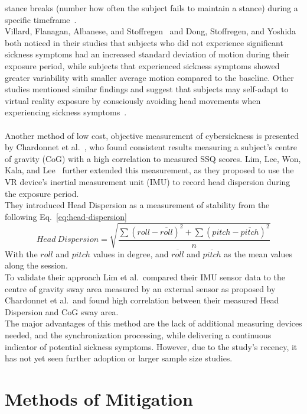 stance breaks (number how often the subject fails to maintain a stance) during a specific
timeframe~\cite{Rebenitsch2016}.
\\
Villard, Flanagan, Albanese, and Stoffregen~\cite{Villard2008} and Dong, Stoffregen, and
Yoshida~\cite{Dong2011, Dong2010} both noticed in their studies that subjects who did not experience significant
sickness symptoms had an increased standard deviation of motion during their exposure period, while subjects that
experienced sickness symptoms showed greater variability with smaller average motion compared to the baseline.
Other studies mentioned similar findings and suggest that subjects may self-adapt to virtual reality exposure by
consciously avoiding head movements when experiencing sickness symptoms~\cite{Rebenitsch2016}.
\\
\\
Another method of low cost, objective measurement of cybersickness is presented by Chardonnet et
al.~\cite{Chardonnet2015}, who found consistent results measuring a subject's centre of gravity (CoG) with a high
correlation to measured SSQ scores.
Lim, Lee, Won, Kala, and Lee~\cite{Lim2020} further extended this measurement, as they proposed to use the VR device's
inertial measurement unit (IMU) to record head dispersion during the exposure period.
\\
They introduced Head Dispersion as a measurement of stability from the following Eq.~\ref{eq:head-dispersion}
\begin{equation}
    \label{eq:head-dispersion}
    Head\ Dispersion = \sqrt{\frac{\sum(roll - \overline{roll})^2 + \sum{(pitch - \overline{pitch})^2}} {n}}
\end{equation}
With the $roll$ and $pitch$ values in degree, and $\overline{roll}$ and $\overline{pitch}$ as the mean values along
the session.
\\
To validate their approach Lim et al.\ compared their IMU sensor data to the centre of gravity sway area measured by an
external sensor as proposed by Chardonnet et al.\ and found high correlation between their measured Head Dispersion
and CoG sway area.
\\
The major advantages of this method are the lack of additional measuring devices needed, and the synchronization
processing, while delivering a continuous indicator of potential sickness symptoms.
However, due to the study's recency, it has not yet seen further adoption or larger sample size studies.


\section{Methods of Mitigation}\label{sec:methods-of-mitigation}

